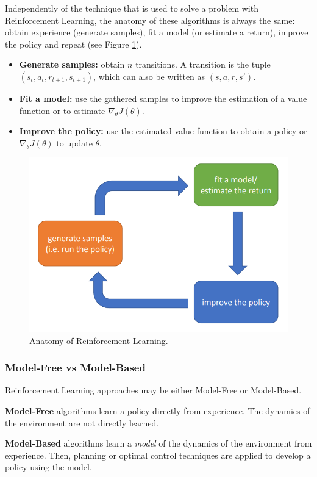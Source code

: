 Independently of the technique that is used to solve a problem with Reinforcement Learning, the anatomy of these algorithms is always the same: obtain experience (generate samples), fit a model (or estimate a return), improve the policy and repeat (see Figure \ref{fig:RL_anatomy}). 

\begin{itemize}
    \item \textbf{Generate samples:} obtain $n$ transitions. A transition is the tuple $(s_{t}, a_{t}, r_{t+1}, s_{t+1})$, which can also be written as $(s, a, r, s')$.
    \item \textbf{Fit a model:} use the gathered samples to improve the estimation of a value function or to estimate $\nabla_{\theta} J(\theta)$.
    \item \textbf{Improve the policy:} use the estimated value function to obtain a policy or $\nabla_{\theta} J(\theta)$ to update $\theta$.
\end{itemize}

\begin{figure}[h]
    \centering
    \includegraphics[width=0.7\linewidth]{imagenes/cap1/RL_anatomy.png}
    \caption{Anatomy of Reinforcement Learning.\protect\footnotemark}
    \label{fig:RL_anatomy}
\end{figure}

\subsubsection{Model-Free vs Model-Based}
Reinforcement Learning approaches may be either Model-Free or Model-Based.

\textbf{Model-Free} algorithms learn a policy directly from experience. The dynamics of the environment are not directly learned.

\textbf{Model-Based} algorithms learn a \emph{model} of the dynamics of the environment from experience. Then, planning or optimal control techniques are applied to develop a policy using the model.

